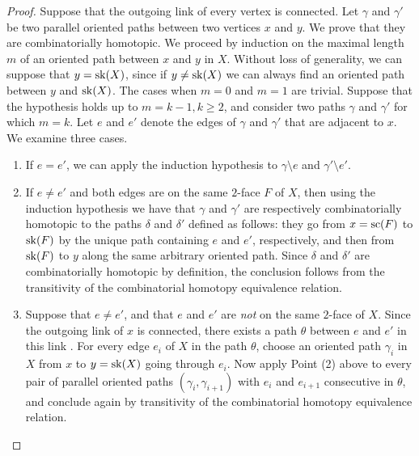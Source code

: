\begin{proof}
    Suppose that the outgoing link of every vertex is  connected. 
    Let $\gamma$ and $\gamma'$ be two parallel oriented paths between two vertices $x$ and $y$. 
    We prove that they are combinatorially homotopic. 
    We proceed by induction on the maximal length $m$ of an oriented path between $x$ and $y$ in $X$. 
    Without loss of generality, we can suppose that $y=\mathrm{sk}(X)$, since if $y\neq\mathrm{sk}(X)$ we can always find an oriented path between $y$ and $\mathrm{sk}(X)$.
    The cases when $m=0$ and $m=1$ are trivial. 
    Suppose that the hypothesis holds up to $m=k-1, k\geq 2$, and consider two paths $\gamma$ and $\gamma'$ for which $m=k$. 
    Let $e$ and $e'$ denote the edges of $\gamma$ and $\gamma'$ that are adjacent to $x$. 
    We examine three cases.
    \begin{enumerate}
        \item If $e=e'$, we can apply the induction hypothesis to $\gamma \setminus e$ and $\gamma' \setminus e'$. 
        \item If $e \neq e'$ and both edges are on the same $2$-face $F$ of $X$, then using the induction hypothesis we have that $\gamma$ and $\gamma'$ are respectively combinatorially homotopic to the paths $\delta$ and $\delta'$ defined as follows: they go from $x=\mathrm{sc}(F)$ to $\mathrm{sk}(F)$ by the unique path containing $e$ and $e'$, respectively, and then from $\mathrm{sk}(F)$ to $y$ along the same arbitrary oriented path. 
        Since $\delta$ and $\delta'$ are combinatorially homotopic by definition, the conclusion follows from the transitivity of the combinatorial homotopy equivalence relation. 
        \item Suppose that $e\neq e'$, and that $e$ and $e'$ are \emph{not} on the same $2$-face of $X$. 
        Since the outgoing link of $x$ is  connected, there exists a  path $\theta$ between  $e$ and $e'$ in this link . 
        For every edge $e_i$ of $X$ in the path $\theta$, choose an oriented path $\gamma_i$ in $X$ from $x$ to $y=\mathrm{sk}(X)$ going through $e_i$. 
        Now apply Point (2) above to every pair of parallel oriented paths $(\gamma_i, \gamma_{i+1})$ with $e_i$ and $e_{i+1}$ consecutive in $\theta$, and conclude again by transitivity of the combinatorial homotopy equivalence relation. 
    \end{enumerate}


\end{proof}
